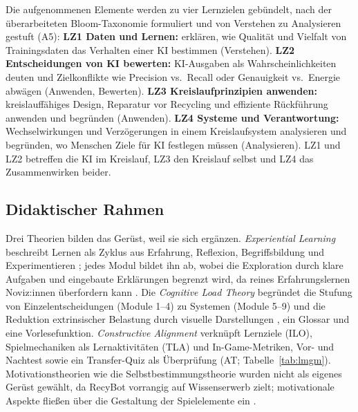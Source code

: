 \documentclass[sigconf,nonacm]{acmart}
\begin{document}
Die aufgenommenen Elemente werden zu vier Lernzielen gebündelt, nach der überarbeiteten Bloom-Taxonomie formuliert \cite{anderson2001} und von Verstehen zu Analysieren gestuft (A5):
\textbf{LZ1 Daten und Lernen:} erklären, wie Qualität und Vielfalt von Trainingsdaten das Verhalten einer KI bestimmen (Verstehen).
\textbf{LZ2 Entscheidungen von KI bewerten:} KI-Ausgaben als Wahrscheinlichkeiten deuten und Zielkonflikte wie Precision vs.\ Recall oder Genauigkeit vs.\ Energie abwägen (Anwenden, Bewerten).
\textbf{LZ3 Kreislaufprinzipien anwenden:} kreislauffähiges Design, Reparatur vor Recycling und effiziente Rückführung anwenden und begründen (Anwenden).
\textbf{LZ4 Systeme und Verantwortung:} Wechselwirkungen und Verzögerungen in einem Kreislaufsystem analysieren und begründen, wo Menschen Ziele für KI festlegen müssen (Analysieren).
LZ1 und LZ2 betreffen die KI im Kreislauf, LZ3 den Kreislauf selbst und LZ4 das Zusammenwirken beider.

\subsection{Didaktischer Rahmen}
Drei Theorien bilden das Gerüst, weil sie sich ergänzen. \textit{Experiential Learning} beschreibt Lernen als Zyklus aus Erfahrung, Reflexion, Begriffsbildung und Experimentieren \cite{kolb1984}; jedes Modul bildet ihn ab, wobei die Exploration durch klare Aufgaben und eingebaute Erklärungen begrenzt wird, da reines Erfahrungslernen Noviz:innen überfordern kann \cite{kirschner2006}. Die \textit{Cognitive Load Theory} \cite{sweller1988,paas2010} begründet die Stufung von Einzelentscheidungen (Module 1--4) zu Systemen (Module 5--9) und die Reduktion extrinsischer Belastung durch visuelle Darstellungen \cite{mayer2009}, ein Glossar und eine Vorlesefunktion. \textit{Constructive Alignment} \cite{biggs2011} verknüpft Lernziele (ILO), Spielmechaniken als Lernaktivitäten (TLA) und In-Game-Metriken, Vor- und Nachtest sowie ein Transfer-Quiz als Überprüfung (AT; Tabelle~\ref{tab:lmgm}). Motivationstheorien wie die Selbstbestimmungstheorie wurden nicht als eigenes Gerüst gewählt, da RecyBot vorrangig auf Wissenserwerb zielt; motivationale Aspekte fließen über die Gestaltung der Spielelemente ein \cite{hanus2015,vanroy2019}.
\end{document}
